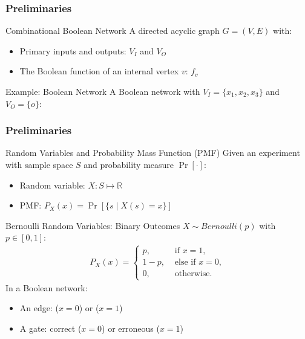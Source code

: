 \begin{frame}
  \frametitle{Preliminaries}
  \begin{block}{Combinational Boolean Network}
    A directed acyclic graph $G=(V,E)$ with:
    \pause
    \begin{itemize}
      \item Primary inputs and outputs: $V_I$ and $V_O$
            \pause
      \item The Boolean function of an internal vertex $v$: $f_v$
            \pause
    \end{itemize}
  \end{block}
  \begin{block}{Example: Boolean Network}
    A Boolean network with $V_I=\{x_1,x_2,x_3\}$ and $V_O=\{o\}$:
    \begin{figure}
      \centering
      
    \end{figure}
  \end{block}
\end{frame}

\begin{frame}
  \frametitle{Preliminaries}
  \begin{block}{Random Variables and Probability Mass Function (PMF)}
    Given an experiment with sample space $S$ and probability measure $\Pr[\cdot]$:
    \pause
    \begin{itemize}
      \item Random variable: $X:S\mapsto\mathbb{R}$
            \pause
      \item PMF: $P_X(x)=\Pr[\{s \mid X(s)=x\}]$
    \end{itemize}
  \end{block}
  \pause
  \begin{block}{Bernoulli Random Variables: Binary Outcomes}
    $X\sim\textit{Bernoulli}(p)$ with $p\in[0,1]$:
    \pause
    \begin{align*}
      P_X(x)=
      \left\{
      \begin{array}{ll}
        p,   & \mbox{ if } x = 1,      \\
        1-p, & \mbox{ else if } x = 0, \\
        0,   & \mbox{ otherwise. }
      \end{array}
      \right.
    \end{align*}
    \pause
    In a Boolean network:
    \pause
    \begin{itemize}
      \item An edge: \false ($x=0$) or \true ($x=1$)
            \pause
      \item A gate: correct ($x=0$) or erroneous ($x=1$)
    \end{itemize}
  \end{block}
\end{frame}